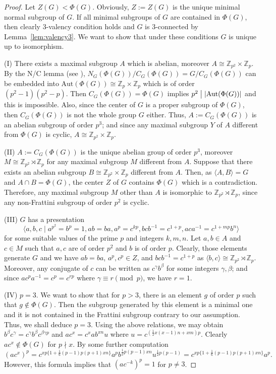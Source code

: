 \documentclass[a4paper,12pt]{article}
\theoremstyle{definition}
\theoremstyle{remark}
\theoremstyle{theorem}
\newcommand{\divides}{\bigm|}
\begin{document}
\begin{proof}
Let $Z(G)<\Phi(G)$. Obviously, $Z:=Z(G)$ is the unique minimal normal subgroup of $G$. If all minimal subgroups of $G$ are contained in $\Phi(G)$, then clearly $3$-valency condition holds and $G$ is $3$-connected by Lemma~\ref{lem:valency3}. We want to show that under these conditions $G$ is unique up to isomorphism. 

  (I) There exists a maximal subgroup $A$ which is abelian, moreover
  $A\cong \mathbb{Z}_{p^2}\times\mathbb{Z}_p$. By the N/C lemma (see
  \cite[Theorem 7.1]{Rotman1995}),
  $N_G(\Phi(G))/C_G(\Phi(G))=G/C_G(\Phi(G))$
  can be embedded into
  $\mathrm{Aut}(\Phi(G))\cong \mathbb{Z}_p\times\mathbb{Z}_p$ which is
  of order $(p^2-1)(p^2-p)$. Then $C_G(\Phi(G))=\Phi(G)$
  implies $p^2\divides |\mathrm{Aut}(\Phi(G))|$ and this is
  impossible. Also, since the center of $G$ is a proper subgroup of
  $\Phi(G)$, then $C_G(\Phi(G))$ is not the whole group $G$
  either. Thus, $A:=C_G(\Phi(G))$ is an abelian subgroup of
  order $p^3$; and since any maximal subgroup $Y$ of $A$ different
  from $\Phi(G)$ is cyclic,
  $A\cong \mathbb{Z}_{p^2}\times\mathbb{Z}_p$.

  (II) $A:=C_G(\Phi(G))$ is the unique abelian group of order
  $p^3$, moreover $M\cong \mathbb{Z}_{p^2}\rtimes\mathbb{Z}_p$ for any
  maximal subgroup $M$ different from $A$. Suppose that there exists
  an abelian subgroup $B\cong \mathbb{Z}_{p^2}\times\mathbb{Z}_p$
  different from $A$. Then, as $\langle A,B\rangle=G$ and
  $A\cap B=\Phi(G)$, the center $Z$ of $G$ contains $\Phi(G)$ which is
  a contradiction. Therefore, any maximal subgroup $M$ other than $A$
  is isomorphic to $\mathbb{Z}_{p^2}\rtimes\mathbb{Z}_p$, since any
  non-Frattini subgroup of order $p^2$ is cyclic.

  (III) $G$ has a presentation
  $$ \langle a,b,c\mid a^{p^2}=b^p=1, ab=ba, a^p=c^{kp},
  bcb^{-1}=c^{1+p}, aca^{-1}=c^{1+mp}b^n \rangle$$
  for some suitable values of the prime $p$ and integers $k,m,n$. Let
  $a,b\in A$ and $c\in M$ such that $a,c$ are of order $p^2$ and $b$
  is of order $p$. Clearly, those elements generate $G$ and we have
  $ab=ba$, $a^p,c^p\in Z$, and $bcb^{-1}=c^{1+p}$ as
  $\langle b,c\rangle\cong
  \mathbb{Z}_{p^2}\rtimes\mathbb{Z}_p$.
  Moreover, any conjugate of $c$ can be written as
  $c^{\gamma}b^{\beta}$ for some integers $\gamma,\beta$; and since
  $ac^pa^{-1}=c^p=c^{rp}$ where $\gamma\equiv r \pmod{p}$, we have
  $r=1$.

  (IV) $p=3$. We want to show that for $p>3$, there is an element $g$
  of order $p$ such that $g\notin\Phi(G)$. Then the subgroup generated
  by this element is a minimal one and it is not contained in the
  Frattini subgroup contrary to our assumption. Thus, we shall deduce
  $p=3$. Using the above relations, we may obtain
  $b^{\beta}c^{\gamma}=c^{\gamma}b^{\beta}c^{\beta\gamma p}$ and
  $ac^x=c^xab^{xn}u$ where $u=c^{(\frac{1}{2}x(x-1)n+xm)p}$. Clearly
  $ac^x\notin\Phi(G)$ for $p\nmid x$. By some further computation
  $$
  (ac^x)^p=c^{xp\{1+\frac{1}{6}(p-1)p(p+1)xn\}}a^pb^{\frac{1}{2}p(p-1)xn}u^{\frac{1}{2}p(p-1)}=c^{xp\{1+\frac{1}{6}(p-1)p(p+1)xn\}}a^p.  $$
  However, this formula implies that $(ac^{-k})^p=1$ for $p\neq 3$.
 

\end{proof}
\end{document}

